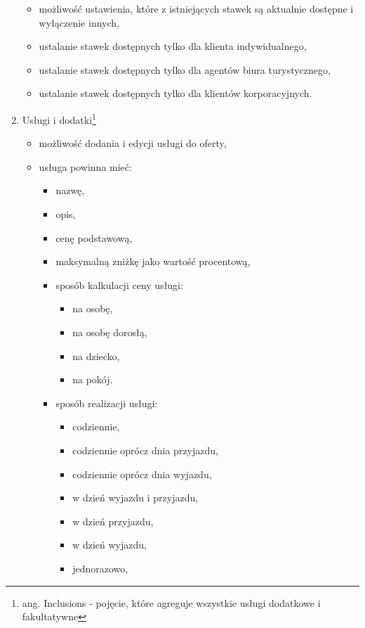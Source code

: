 \documentclass[a4paper,onecolumn,oneside,11pt,wide,floatssmall]{mwrep}
\theoremstyle{definition}
\theoremstyle{plain}%
\theoremstyle{remark}
\begin{document}
\begin{enumerate}
\begin{itemize}
\begin{itemize}
        \end{itemize}
      \item możliwość ustawienia, które z istniejących stawek są aktualnie dostępne i wyłączenie innych,
      \item ustalanie stawek dostępnych tylko dla klienta indywidualnego,
      \item ustalanie stawek dostępnych tylko dla agentów biura turystycznego,
      \item ustalanie stawek dostępnych tylko dla klientów korporacyjnych.
    \end{itemize}
  \item Usługi i dodatki\footnote{ang. Inclusions - pojęcie, które agreguje wszystkie usługi dodatkowe i fakultatywne}
    \begin{itemize}
      \item możliwość dodania i edycji usługi do oferty,
      \item usługa powinna mieć:
        \begin{itemize}
          \item nazwę,
          \item opis,
          \item cenę podstawową,
          \item maksymalną zniżkę jako wartość procentową,
          \item sposób kalkulacji ceny usługi:
            \begin{itemize}
              \item na osobę,
              \item na osobę dorosłą,
              \item na dziecko,
              \item na pokój.
            \end{itemize}
          \item sposób realizacji usługi:\label{sposob-realizacji}
            \begin{itemize}
              \item codziennie,
              \item codziennie oprócz dnia przyjazdu,
              \item codziennie oprócz dnia wyjazdu,
              \item w dzień wyjazdu i przyjazdu,
              \item w dzień przyjazdu,
              \item w dzień wyjazdu,
              \item jednorazowo,

\end{itemize}
\end{itemize}
\end{itemize}
\end{enumerate}
\end{document}
